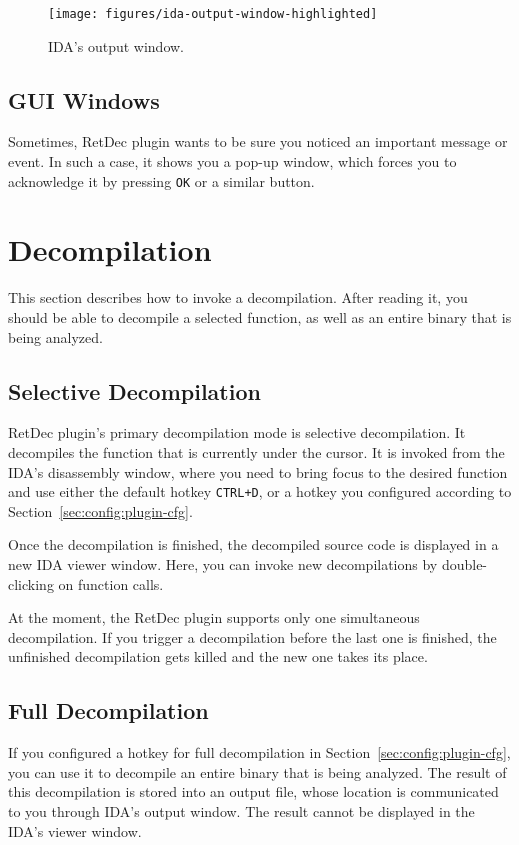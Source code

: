 \documentclass[pdftex, a4paper,12pt, oneside, svgnames]{article}
\begin{document}
\begin{figure}[!ht]
	\centering
	\texttt{[image: figures/ida-output-window-highlighted]}
	\caption{IDA's output window.}
	\label{fig:ida-output-window}
\end{figure}

\subsection{GUI Windows}
Sometimes, RetDec plugin wants to be sure you noticed an important message or event. In such a case, it shows you a pop-up window, which forces you to acknowledge it by pressing \texttt{OK} or a similar button.

\section{Decompilation}
\label{sec:decompilation}
This section describes how to invoke a decompilation. After reading it, you should be able to decompile a selected function, as well as an entire binary that is being analyzed.

\subsection{Selective Decompilation}
\label{sec:selective-decompilation}
RetDec plugin's primary decompilation mode is selective decompilation. It decompiles the function that is currently under the cursor. It is invoked from the IDA's disassembly window, where you need to bring focus to the desired function and use either the default hotkey \texttt{CTRL+D}, or a hotkey you configured according to Section~\ref{sec:config:plugin-cfg}.

Once the decompilation is finished, the decompiled source code is displayed in a new IDA viewer window. Here, you can invoke new decompilations by double-clicking on function calls.

At the moment, the RetDec plugin supports only one simultaneous decompilation. If you trigger a decompilation before the last one is finished, the unfinished decompilation gets killed and the new one takes its place.

\subsection{Full Decompilation}
If you configured a hotkey for full decompilation in Section~\ref{sec:config:plugin-cfg}, you can use it to decompile an entire binary that is being analyzed. The result of this decompilation is stored into an output file, whose location is communicated to you through IDA's output window. The result cannot be displayed in the IDA's viewer window.
\end{document}
